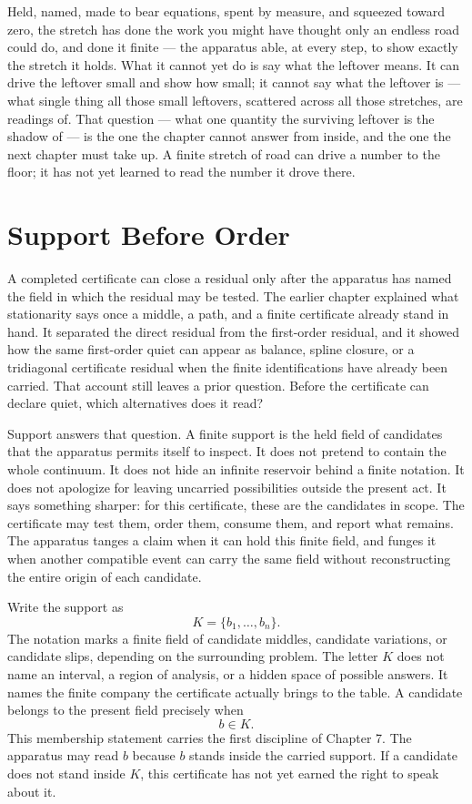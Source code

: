 Held, named, made to bear equations, spent by measure, and squeezed toward zero, the stretch has done the work you might have thought only an endless road could do, and done it finite --- the apparatus able, at every step, to show exactly the stretch it holds. What it cannot yet do is say what the leftover means. It can drive the leftover small and show how small; it cannot say what the leftover is --- what single thing all those small leftovers, scattered across all those stretches, are readings of. That question --- what one quantity the surviving leftover is the shadow of --- is the one the chapter cannot answer from inside, and the one the next chapter must take up. A finite stretch of road can drive a number to the floor; it has not yet learned to read the number it drove there.

\section{Support Before Order}

A completed certificate can close a residual only after the apparatus has
named the field in which the residual may be tested. The earlier chapter
explained what stationarity says once a middle, a path, and a finite
certificate already stand in hand. It separated the direct residual from the
first-order residual, and it showed how the same first-order quiet can appear
as balance, spline closure, or a tridiagonal certificate residual when the
finite identifications have already been carried. That account still leaves a
prior question. Before the certificate can declare quiet, which alternatives
does it read?

Support answers that question. A finite support is the held field of candidates
that the apparatus permits itself to inspect. It does not pretend to contain
the whole continuum. It does not hide an infinite reservoir behind a finite
notation. It does not apologize for leaving uncarried possibilities outside
the present act. It says something sharper: for this certificate, these are
the candidates in scope. The certificate may test them, order them, consume
them, and report what remains. The apparatus tanges a claim when it can hold this finite field, and funges it when another compatible event can carry the same field without reconstructing the entire origin of each candidate.

Write the support as
\[
  K = \{b_1,\ldots,b_n\}.
\]
The notation marks a finite field of candidate middles, candidate variations,
or candidate slips, depending on the surrounding problem. The letter \(K\)
does not name an interval, a region of analysis, or a hidden space of possible
answers. It names the finite company the certificate actually brings to the
table. A candidate belongs to the present field precisely when
\[
  b \in K.
\]
This membership statement carries the first discipline of Chapter 7. The
apparatus may read \(b\) because \(b\) stands inside the carried support. If a
candidate does not stand inside \(K\), this certificate has not yet earned the
right to speak about it.

